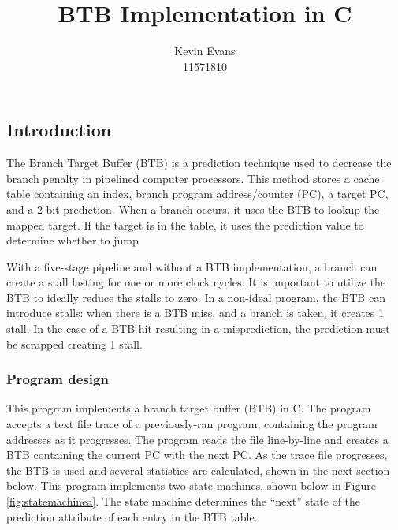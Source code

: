 \documentclass{article}
\title{BTB Implementation in C}
\author{Kevin Evans \\ {\small 11571810}}
\begin{document}
	\maketitle
	\subsection*{Introduction}
	The Branch Target Buffer (BTB) is a prediction technique used to decrease the branch penalty in pipelined computer processors. This method stores a cache table containing an index, branch program address/counter (PC), a target PC, and a 2-bit prediction. When a branch occurs, it uses the BTB to lookup the mapped target. If the target is in the table, it uses the prediction value to determine whether to jump
	
	With a five-stage pipeline and without a BTB implementation, a branch can create a stall lasting for one or more clock cycles. It is important to utilize the BTB to ideally reduce the stalls to zero. In a non-ideal program, the BTB can introduce stalls: when there is a BTB miss, and a branch is taken, it creates 1 stall. In the case of a BTB hit resulting in a misprediction, the prediction must be scrapped creating 1 stall. 
	\subsubsection*{Program design}
	This program implements a branch target buffer (BTB) in C. The program accepts a text file trace of a previously-ran program, containing the program addresses as it progresses. The program reads the file line-by-line and creates a BTB containing the current PC with the next PC. As the trace file progresses, the BTB is used and several statistics are calculated, shown in the next section below. This program implements two state machines, shown below in Figure \ref{fig:statemachinea}. The state machine determines the ``next'' state of the prediction attribute of each entry in the BTB table.
\end{document}
